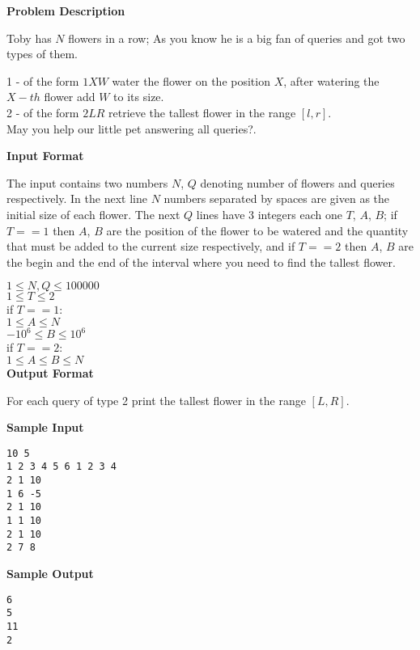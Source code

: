 \textbf{\large Problem Description}

Toby has $N$ flowers in a row; As you know he is a big fan of queries and got two types of them.

1 - of the form $1 X W $ water the flower on the position $X$, after watering the $X-th$ flower add $W$ to its size.\\
2 - of the form $2 L R $ retrieve the tallest flower in the range $[l, r]$.\\

May you help our little pet answering all queries?.

\textbf{\large Input Format}

The input contains two numbers $N$, $Q$ denoting number of flowers and queries
respectively. In the next line $N$ numbers separated by spaces are given as the initial size of each flower.
The next $Q$ lines have 3 integers each one $T$, $A$, $B$; if $T == 1$ then $A$, $B$
are the position of the flower to be watered and the quantity that must be added to the current size respectively, and if
$T == 2$ then $A$, $B$ are the begin and the end of the interval where you need to find the tallest flower.

$1 \le N, Q \le 100000$ \\
$1 \le T \le 2 $\\
if $ T == 1 $:\\
$  1 \le A \le N $\\
$  -10^6 \le B \le 10^6$\\
if $ T == 2 $:\\
$  1 \le A \le B \le N $\\

\textbf{\large Output Format}

For each query of type 2 print the tallest flower in the range $[L, R]$.

\textbf{\large Sample Input}

\begin{verbatim}
10 5
1 2 3 4 5 6 1 2 3 4
2 1 10
1 6 -5
2 1 10
1 1 10
2 1 10
2 7 8
\end{verbatim}

\textbf{\large Sample Output}

\begin{verbatim}
6
5
11
2
\end{verbatim}

\newpage
